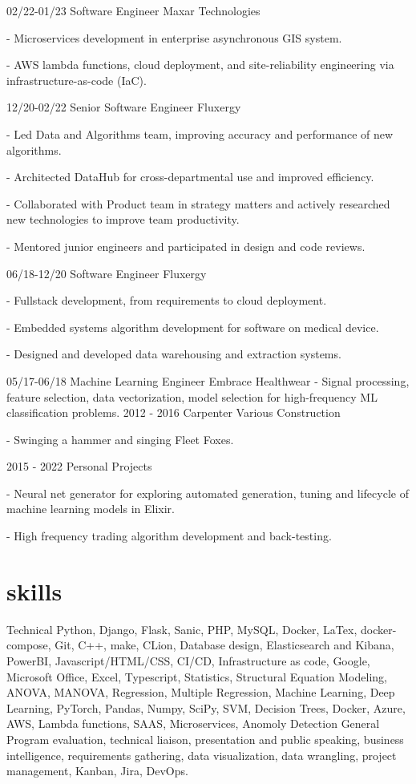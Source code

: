 \documentclass[]{twentysecondcv}
\begin{document}
\begin{twenty}
  \twentyitem
    {02/22-01/23}
    {Software Engineer}
    {Maxar Technologies}
    {- Microservices development in enterprise asynchronous GIS system. 

	- AWS lambda functions, cloud deployment, and site-reliability engineering via infrastructure-as-code (IaC).

}

  \twentyitem
    {12/20-02/22}
    {Senior Software Engineer}
    {Fluxergy}
    {- Led Data and Algorithms team, improving accuracy and performance of new algorithms.

	- Architected DataHub for cross-departmental use and improved efficiency.

	- Collaborated with Product team in strategy matters and actively researched new technologies to improve team productivity.
	
	- Mentored junior engineers and participated in design and code reviews.

	} 
  \twentyitem
    {06/18-12/20}
    {Software Engineer}
    {Fluxergy}
    {- Fullstack development, from requirements to cloud deployment.

	- Embedded systems algorithm development for software on medical device.

	- Designed and developed data warehousing and extraction systems.

	} 
  \twentyitem
    {05/17-06/18}
    {Machine Learning Engineer}
    {Embrace Healthwear}
    {- Signal processing, feature selection, data vectorization, model selection for high-frequency ML classification problems.
	} 
  \twentyitem
    {2012 - 2016}
    {Carpenter}
    {Various Construction}
    {- Swinging a hammer and singing Fleet Foxes.

	} 
  \twentyitem
    {2015 - 2022}
    {Personal Projects}
    {}
    {- Neural net generator for exploring automated generation, tuning and lifecycle of machine learning models in Elixir.

	- High frequency trading algorithm development and back-testing.} 
\end{twenty}

\section{skills}
	\begin{twentyshort}
	\twentyitemshort
	{Technical}
	{Python, Django, Flask, Sanic, PHP, MySQL, Docker, LaTex, docker-compose, Git, C++, make, CLion, Database design, Elasticsearch and Kibana, PowerBI, Javascript/HTML/CSS, CI/CD, Infrastructure as code, Google, Microsoft Office, Excel, Typescript, Statistics, Structural Equation Modeling, ANOVA, MANOVA, Regression, Multiple Regression, Machine Learning, Deep Learning, PyTorch, Pandas, Numpy, SciPy, SVM, Decision Trees, Docker, Azure, AWS, Lambda functions, SAAS, Microservices, Anomoly Detection}
	\twentyitemshort
	{General}
	{Program evaluation, technical liaison, presentation and public speaking, business intelligence, requirements gathering, data visualization, data wrangling, project management, Kanban, Jira, DevOps.}
	\end{twentyshort}

\end{document}

